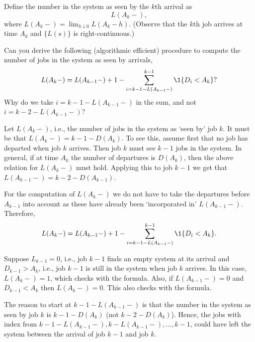 \begin{exercise} 
Define the number in the system as seen by the $k$th arrival  as
\begin{equation}
  \label{eq:Lk}
  L(A_k-),
\end{equation}
where $L(A_k-) = \lim_{h\downarrow 0} L(A_k - h)$. (Observe that the $k$th job arrives at time $A_k$ and $\{L(s)\}$ is right-continuous.)

Can you derive the following (algorithmic efficient) procedure to
    compute the number of jobs in the system as seen by arrivals,
  \begin{equation*}
    L(A_k-) = L(A_{k-1}-)+1 - \sum_{i= k-1 - L(A_{k-1}-)}^{k-1} \1{D_i< A_k}?
  \end{equation*} Why do we take $i=k-1-L(A_{k-1}-)$ in  the sum, and not $i=k-2-L(A_{k-1}-)$?
\begin{solution}
  Let $ L(A_{k}-)$, i.e., the number of jobs in the system as
  `seen by' job $k$. It must be that $L(A_{k}-)=k-1 - D(A_{k})$. To see
  this, assume first that no job has departed when job $k$
  arrives. Then job $k$ must see $k-1$ jobs in the system. In general,
  if at time $A_k$ the number of departures is $D(A_k)$, then the
  above relation for $L(A_k-)$ must hold. Applying this to job $k-1$ we get that $L(A_{k-1}-) = k-2 - D(A_{k-1})$. 

  For the computation of $L(A_k-)$ we do not have to take the departures
  before $A_{k-1}$ into account as these have already been
  `incorporated in' $L(A_{k-1}-)$.  Therefore,
  \begin{equation*}
    L(A_k-) = L(A_{k-1}-) + 1 - \sum_{i= k-1 - L(A_{k-1}-)}^{k-1} \1{D_i< A_k}.
  \end{equation*}

    Suppose $L_{k-1}=0$, i.e., job $k-1$ finds an empty system at its
    arrival and $D_{k-1}>A_{k}$, i.e., job $k-1$ is still in the
    system when job $k$ arrives. In this case, $L(A_{k}-)=1$, which checks
    with the formula.  Also, if $L(A_{k-1}-)=0$ and $D_{k-1}< A_k$ then
    $L(A_k-) = 0$. This also checks with the formula. 

    The reason to start at $k-1-L(A_{k-1}-)$ is that the number in the
    system as seen by job $k$ is $k-1 - D(A_k)$ (not
    $k-2-D(A_k)$). Hence, the jobs with index from
    $k-1-L(A_{k-1}-), k-L(A_{k-1}-), \ldots, k-1$, could have left the system
    between the arrival of job $k-1$ and job $k$.
\end{solution}
\end{exercise}


